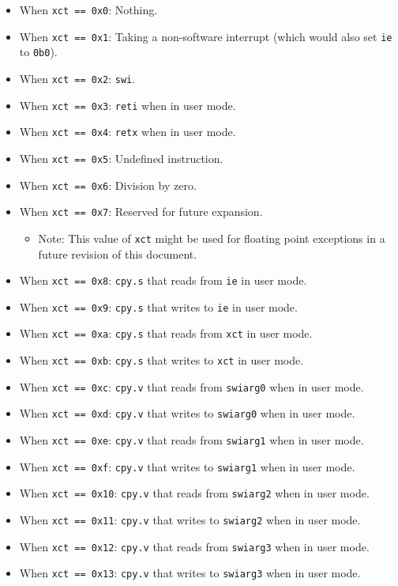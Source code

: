 \documentclass{article}
\begin{document}
	\begin{itemize}
	\item When \texttt{xct == 0x0}: Nothing.
	\item When \texttt{xct == 0x1}:
		Taking a non-software interrupt (which would also set \texttt{ie}
		to \texttt{0b0}).
	\item When \texttt{xct == 0x2}: \texttt{swi}.
	\item When \texttt{xct == 0x3}: \texttt{reti} when in user mode.
	\item When \texttt{xct == 0x4}: \texttt{retx} when in user mode.
	\item When \texttt{xct == 0x5}: Undefined instruction.
	\item When \texttt{xct == 0x6}: Division by zero.
	\item When \texttt{xct == 0x7}:
		Reserved for future expansion.
		\begin{itemize}
		\item Note: This value of \texttt{xct} might be used for
			floating point exceptions in
			a future revision of this document.
		\end{itemize}

	\item When \texttt{xct == 0x8}:
		\texttt{cpy.s} that reads from \texttt{ie} in user mode.
	\item When \texttt{xct == 0x9}:
		\texttt{cpy.s} that writes to \texttt{ie} in user mode.
	\item When \texttt{xct == 0xa}:
		\texttt{cpy.s} that reads from \texttt{xct} in user mode.
	\item When \texttt{xct == 0xb}:
		\texttt{cpy.s} that writes to \texttt{xct} in user mode.

	\item When \texttt{xct == 0xc}:
		\texttt{cpy.v} that reads from \texttt{swiarg0} when in user mode.
	\item When \texttt{xct == 0xd}:
		\texttt{cpy.v} that writes to \texttt{swiarg0} when in user mode.
	\item When \texttt{xct == 0xe}:
		\texttt{cpy.v} that reads from \texttt{swiarg1} when in user mode.
	\item When \texttt{xct == 0xf}:
		\texttt{cpy.v} that writes to \texttt{swiarg1} when in user mode.

	\item When \texttt{xct == 0x10}:
		\texttt{cpy.v} that reads from \texttt{swiarg2} when in user mode.
	\item When \texttt{xct == 0x11}:
		\texttt{cpy.v} that writes to \texttt{swiarg2} when in user mode.
	\item When \texttt{xct == 0x12}:
		\texttt{cpy.v} that reads from \texttt{swiarg3} when in user mode.
	\item When \texttt{xct == 0x13}:
		\texttt{cpy.v} that writes to \texttt{swiarg3} when in user mode.


\end{itemize}
\end{document}
